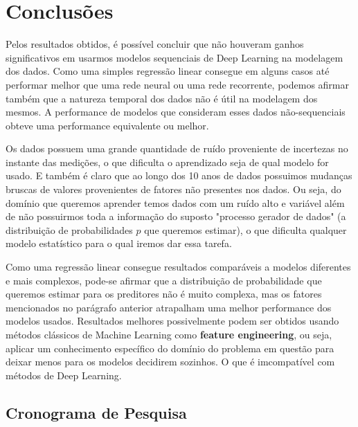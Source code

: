 \chapter{Conclusões}
\label{cap:conclusoes}


Pelos resultados obtidos, é possível concluir que não houveram ganhos significativos em usarmos modelos sequenciais de Deep Learning na modelagem dos dados. Como uma simples regressão linear consegue em alguns casos até performar melhor que uma rede neural ou uma rede recorrente, podemos afirmar também que a natureza temporal dos dados não é útil na modelagem dos mesmos. A performance de modelos que consideram esses dados não-sequenciais obteve uma performance equivalente ou melhor.

Os dados possuem uma grande quantidade de ruído proveniente de incertezas no instante das medições, o que dificulta o aprendizado seja de qual modelo for usado. E também é claro que ao longo dos 10 anos de dados possuimos mudanças bruscas de valores provenientes de fatores não presentes nos dados. Ou seja, do domínio que queremos aprender temos dados com um ruído alto e variável além de não possuirmos toda a informação do suposto "processo gerador de dados" (a distribuição de probabilidades $p$ que queremos estimar), o que dificulta qualquer modelo estatístico para o qual iremos dar essa tarefa.

Como uma regressão linear consegue resultados comparáveis a modelos diferentes e mais complexos, pode-se afirmar que a distribuição de probabilidade que queremos estimar para os preditores não é muito complexa, mas os fatores mencionados no parágrafo anterior atrapalham uma melhor performance dos modelos usados. Resultados melhores possivelmente podem ser obtidos usando métodos clássicos de Machine Learning como \textbf{feature engineering}, ou seja, aplicar um conhecimento específico do domínio do problema em questão para deixar menos para os modelos decidirem sozinhos. O que é imcompatível com métodos de Deep Learning. 




\section{Cronograma de Pesquisa}


